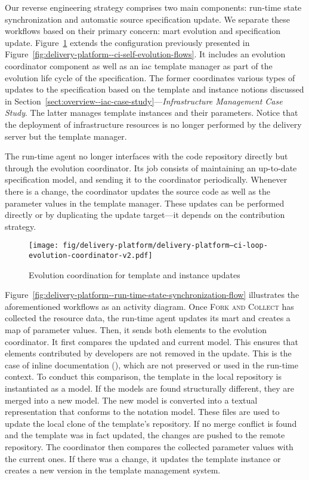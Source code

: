 Our reverse engineering strategy comprises two main components: run-time state synchronization and automatic source specification update. We separate these workflows based on their primary concern: \gls{mart} evolution and specification update. Figure~\ref{fig:delivery-platform--ci-loop-evolution-coordinator} extends the configuration previously presented in Figure~\ref{fig:delivery-platform--ci-self-evolution-flows}. It includes an evolution coordinator component as well as an \gls{iac} template manager as part of the evolution life cycle of the specification. The former coordinates various types of updates to the specification based on the template and instance notions discussed in Section~\ref{sect:overview--iac-case-study}---\emph{Infrastructure Management Case Study}. The latter manages template instances and their parameters. Notice that the deployment of infrastructure resources is no longer performed by the delivery server but the template manager.

The run-time agent no longer interfaces with the code repository directly but through the evolution coordinator. Its job consists of maintaining an up-to-date specification model, and sending it to the coordinator periodically. Whenever there is a change, the coordinator updates the source code as well as the parameter values in the template manager. These updates can be performed directly or by duplicating the update target---it depends on the contribution strategy.

\begin{figure}[H]
	\centering
	\texttt{[image: fig/delivery-platform/delivery-platform--ci-loop-evolution-coordinator-v2.pdf]}
	\caption{Evolution coordination for template and instance updates}
	\label{fig:delivery-platform--ci-loop-evolution-coordinator}
\end{figure}

Figure~\ref{fig:delivery-platform--run-time-state-synchronization-flow} illustrates the aforementioned workflows as an activity diagram. Once \textsc{Fork and Collect} has collected the resource data, the run-time agent updates its \gls{mart} and creates a map of parameter values. Then, it sends both elements to the evolution coordinator. It first compares the updated and current model. This ensures that elements contributed by developers are not removed in the update. This is the case of inline documentation (), which are not preserved or used in the run-time context. To conduct this comparison, the template in the local repository is instantiated as a model. If the models are found structurally different, they are merged into a new model. The new model is converted into a textual representation that conforms to the notation model. These files are used to update the local clone of the template’s repository. If no merge conflict is found and the template was in fact updated, the changes are pushed to the remote repository. The coordinator then compares the collected parameter values with the current ones. If there was a change, it updates the template instance or creates a new version in the template management system.

